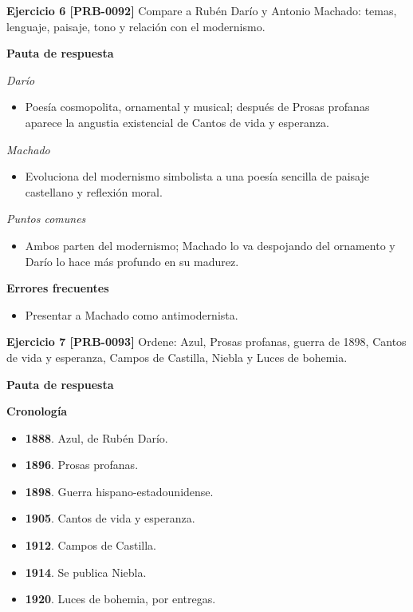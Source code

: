 \documentclass{book}
\begin{document}
\noindent\textbf{Ejercicio 6 [PRB-0092]}
Compare a Rubén Darío y Antonio Machado: temas, lenguaje, paisaje, tono y relación con el modernismo.


\noindent\textbf{Pauta de respuesta}

\noindent\textit{Darío}
\begin{itemize}
\item Poesía cosmopolita, ornamental y musical; después de Prosas profanas aparece la angustia existencial de Cantos de vida y esperanza.
\end{itemize}

\noindent\textit{Machado}
\begin{itemize}
\item Evoluciona del modernismo simbolista a una poesía sencilla de paisaje castellano y reflexión moral.
\end{itemize}

\noindent\textit{Puntos comunes}
\begin{itemize}
\item Ambos parten del modernismo; Machado lo va despojando del ornamento y Darío lo hace más profundo en su madurez.
\end{itemize}

\noindent\textbf{Errores frecuentes}
\begin{itemize}
\item Presentar a Machado como antimodernista.
\end{itemize}

\noindent\textbf{Ejercicio 7 [PRB-0093]}
Ordene: Azul, Prosas profanas, guerra de 1898, Cantos de vida y esperanza, Campos de Castilla, Niebla y Luces de bohemia.


\noindent\textbf{Pauta de respuesta}

\noindent\textbf{Cronología}
\begin{itemize}
\item \textbf{1888}. Azul, de Rubén Darío.
\item \textbf{1896}. Prosas profanas.
\item \textbf{1898}. Guerra hispano-estadounidense.
\item \textbf{1905}. Cantos de vida y esperanza.
\item \textbf{1912}. Campos de Castilla.
\item \textbf{1914}. Se publica Niebla.
\item \textbf{1920}. Luces de bohemia, por entregas.
\end{itemize}
\end{document}
